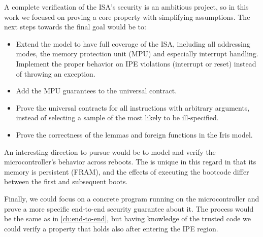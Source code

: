 A complete verification of the \msp ISA's security is an ambitious project, so in this work we focused on proving a core property with simplifying assumptions. The next steps towards the final goal would be to:
\begin{itemize}
\item Extend the model to have full coverage of the \msp ISA, including all addressing modes, the memory protection unit (MPU) and especially interrupt handling. Implement the proper behavior on IPE violations (interrupt or reset) instead of throwing an exception.
\item Add the MPU guarantees to the universal contract.
\item Prove the universal contracts for all instructions with arbitrary arguments, instead of selecting a sample of the most likely to be ill-specified.
\item Prove the correctness of the lemmas and foreign functions in the Iris model.
\end{itemize}

An interesting direction to pursue would be to model and verify the microcontroller's behavior across reboots. The \msp is unique in this regard in that its memory is persistent (FRAM), and the effects of executing the bootcode differ between the first and subsequent boots.

Finally, we could focus on a concrete program running on the microcontroller and prove a more specific end-to-end security guarantee about it. The process would be the same as in \cref{ch:end-to-end}, but having knowledge of the trusted code we could verify a property that holds also after entering the IPE region.





